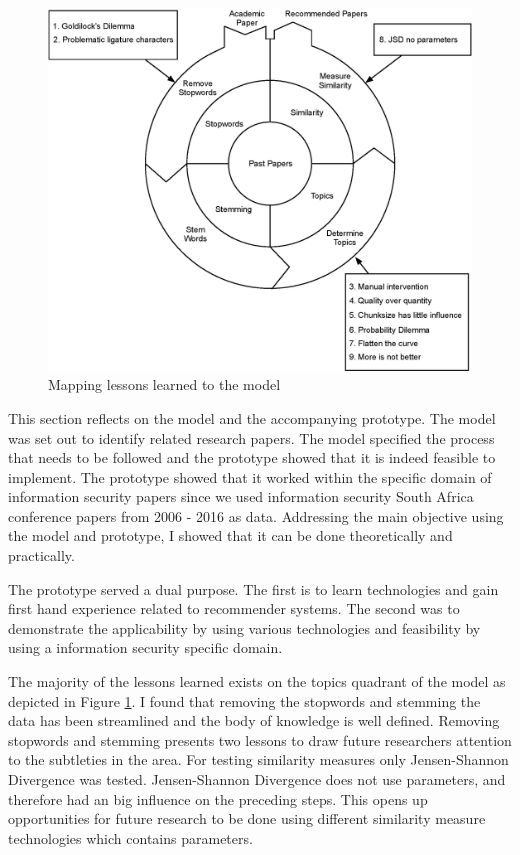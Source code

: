 \begin{figure}[htbp]
\centering
\includegraphics[width=15cm]{./figures/Lesson77.eps}
\caption{Mapping lessons learned to the model}
\label{fig:processing1}
\end{figure}

This section reflects on the model and the accompanying prototype. The model was set out to identify related research papers. The model specified the process that needs to be followed and the prototype showed that it is indeed feasible to implement. The prototype showed that it worked within the specific domain of information security papers since we used information security South Africa conference papers from 2006 - 2016 as data. Addressing the main objective using the model and prototype, I showed that it can be done theoretically and practically.

The prototype served a dual purpose. The first is to learn technologies and gain first hand experience related to recommender systems. The second was to demonstrate the applicability by using various technologies and feasibility by using a information security specific domain. 

The majority of the lessons learned exists on the topics quadrant of the model as depicted in Figure \ref{fig:processing1}. I found that removing the stopwords and stemming the data has been streamlined and the body of knowledge is well defined. Removing stopwords and stemming presents two lessons to draw future researchers attention to the subtleties in the area. For testing similarity measures only Jensen-Shannon Divergence was tested. Jensen-Shannon Divergence does not use parameters, and therefore had an big influence on the preceding steps.
This opens up opportunities for future research to be done using different similarity measure technologies which contains parameters. 

